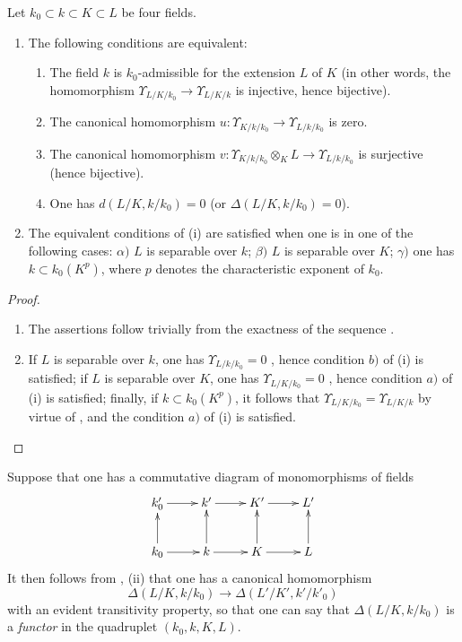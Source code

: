 \begin{proposition}[21.6.2]
\label{0.21.6.2}
Let $k_0\subset k\subset K\subset L$ be four fields.
\begin{enumerate}
  \item[\rm (i)] The following conditions are equivalent:
  \begin{enumerate}
    \item[\rm a)] The field $k$ is $k_0$-admissible for the extension $L$ of $K$ \textup{(}in other words, the homomorphism $\Upsilon_{L/K/k_0}\to\Upsilon_{L/K/k}$ is injective, hence bijective\textup{)}.
    \item[\rm b)] The canonical homomorphism $u:\Upsilon_{K/k/k_0}\to\Upsilon_{L/k/k_0}$ is zero.
    \item[\rm c)] The canonical homomorphism $v:\Upsilon_{K/k/k_0}\otimes_K L\to\Upsilon_{L/k/k_0}$ is surjective \textup{(}hence bijective\textup{)}.
    \item[\rm d)] One has $d(L/K,k/k_0)=0$ \textup{(}or $\Delta(L/K,k/k_0)=0$\textup{)}.
  \end{enumerate}
  \item[\rm (ii)] The equivalent conditions of \textnormal{(i)} are satisfied when one is in one of the following cases: $\alpha)$ $L$ is separable over $k$; $\beta)$ $L$ is separable over $K$; $\gamma)$ one has $k\subset k_0(K^p)$, where $p$ denotes the characteristic exponent of $k_0$.
\end{enumerate}
\end{proposition}

\begin{proof}
\begin{enumerate}
  \item[(i)] The assertions follow trivially from the exactness of the sequence .
  \item[(ii)] If $L$ is separable over $k$, one has $\Upsilon_{L/k/k_0}=0$ , hence condition $b)$ of (i) is satisfied; if $L$ is separable over $K$, one has $\Upsilon_{L/K/k_0}=0$ , hence condition $a)$ of (i) is satisfied; finally, if $k\subset k_0(K^p)$, it follows that $\Upsilon_{L/K/k_0}=\Upsilon_{L/K/k}$ by virtue of , and the condition $a)$ of (i) is satisfied.
\end{enumerate}
\end{proof}

\begin{env}[21.6.3]
\label{0.21.6.3}
Suppose that one has a commutative diagram of monomorphisms of fields
\[
  \xymatrix{
    k'_0\ar[r] & k'\ar[r] & K'\ar[r] & L'\\
    k_0\ar[u]\ar[r] & k\ar[u]\ar[r] & K\ar[u]\ar[r] & L\ar[u]
  }
\]
It then follows from , (ii) that one has a canonical homomorphism
\begin{equation}
\tag{21.6.3.1}
  \label{0.21.6.3.1}
  \Delta(L/K,k/k_0)\to\Delta(L'/K',k'/k'_0)
\end{equation}
with an evident transitivity property, so that one can say that $\Delta(L/K,k/k_0)$ is a \emph{functor} in the quadruplet $(k_0,k,K,L)$.
\end{env}

